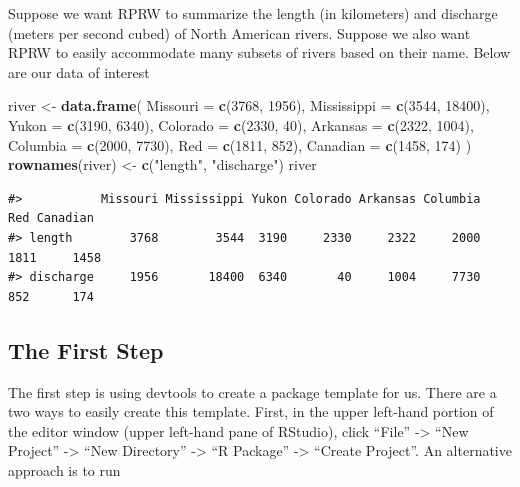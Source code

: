 \documentclass[
]{book}
\newenvironment{Shaded}{\begin{snugshade}}{\end{snugshade}}
\newcommand{\DataTypeTok}[1]{\textcolor[rgb]{0.13,0.29,0.53}{#1}}
\newcommand{\DecValTok}[1]{\textcolor[rgb]{0.00,0.00,0.81}{#1}}
\newcommand{\KeywordTok}[1]{\textcolor[rgb]{0.13,0.29,0.53}{\textbf{#1}}}
\newcommand{\NormalTok}[1]{#1}
\newcommand{\StringTok}[1]{\textcolor[rgb]{0.31,0.60,0.02}{#1}}
\begin{document}
Suppose we want RPRW to summarize the length (in kilometers) and discharge (meters per second cubed) of North American rivers. Suppose we also want RPRW to easily accommodate many subsets of rivers based on their name. Below are our data of interest

\begin{Shaded}
\begin{Highlighting}[]
\NormalTok{river <-}\StringTok{ }\KeywordTok{data.frame}\NormalTok{(}
  \DataTypeTok{Missouri =} \KeywordTok{c}\NormalTok{(}\DecValTok{3768}\NormalTok{, }\DecValTok{1956}\NormalTok{),}
  \DataTypeTok{Mississippi =} \KeywordTok{c}\NormalTok{(}\DecValTok{3544}\NormalTok{, }\DecValTok{18400}\NormalTok{),}
  \DataTypeTok{Yukon =} \KeywordTok{c}\NormalTok{(}\DecValTok{3190}\NormalTok{, }\DecValTok{6340}\NormalTok{),}
  \DataTypeTok{Colorado =} \KeywordTok{c}\NormalTok{(}\DecValTok{2330}\NormalTok{, }\DecValTok{40}\NormalTok{),}
  \DataTypeTok{Arkansas =} \KeywordTok{c}\NormalTok{(}\DecValTok{2322}\NormalTok{, }\DecValTok{1004}\NormalTok{),}
  \DataTypeTok{Columbia =} \KeywordTok{c}\NormalTok{(}\DecValTok{2000}\NormalTok{, }\DecValTok{7730}\NormalTok{),}
  \DataTypeTok{Red =} \KeywordTok{c}\NormalTok{(}\DecValTok{1811}\NormalTok{, }\DecValTok{852}\NormalTok{),}
  \DataTypeTok{Canadian =} \KeywordTok{c}\NormalTok{(}\DecValTok{1458}\NormalTok{, }\DecValTok{174}\NormalTok{)}
\NormalTok{) }
\KeywordTok{rownames}\NormalTok{(river) <-}\StringTok{ }\KeywordTok{c}\NormalTok{(}\StringTok{"length"}\NormalTok{, }\StringTok{"discharge"}\NormalTok{)}
\NormalTok{river}
\end{Highlighting}
\end{Shaded}

\begin{verbatim}
#>           Missouri Mississippi Yukon Colorado Arkansas Columbia  Red Canadian
#> length        3768        3544  3190     2330     2322     2000 1811     1458
#> discharge     1956       18400  6340       40     1004     7730  852      174
\end{verbatim}

\hypertarget{first-step}{%
\subsection{The First Step}\label{first-step}}

The first step is using devtools to create a package template for us. There are a two ways to easily create this template. First, in the upper left-hand portion of the editor window (upper left-hand pane of RStudio), click ``File'' -\textgreater{} ``New Project'' -\textgreater{} ``New Directory'' -\textgreater{} ``R Package'' -\textgreater{} ``Create Project''. An alternative approach is to run
\end{document}
